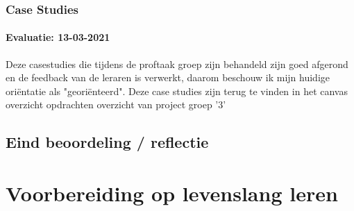 \subsubsection{Case Studies}
\paragraph{Evaluatie: 13-03-2021}
Deze casestudies die tijdens de proftaak groep zijn behandeld zijn goed afgerond en de feedback van de leraren is
verwerkt, daarom beschouw ik mijn huidige oriëntatie als "georiënteerd".
Deze case studies zijn terug te vinden in het canvas overzicht opdrachten overzicht van project groep '3'

\subsection{Eind beoordeling / reflectie}


\newpage


\section{Voorbereiding op levenslang leren}\label{sec:voorbereiding-op-levenslang-leren}

